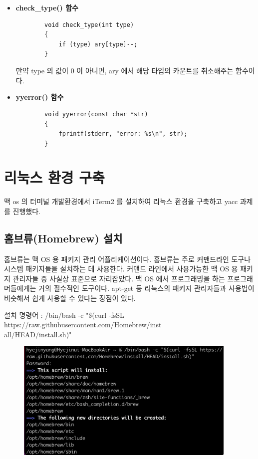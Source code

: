 \documentclass{article}
\begin{document}
\begin{itemize}
\begin{itemize}
		\item {\bf check\_type() 함수}
		\begin{lstlisting}
		void check_type(int type)
		{
			if (type) ary[type]--;
		}
		\end{lstlisting}
		만약 type 의 값이 0 이 아니면, ary 에서 해당 타입의 카운트를 취소해주는 함수이다.
		
		\item {\bf yyerror() 함수}
		\begin{lstlisting}
		void yyerror(const char *str)
		{
			fprintf(stderr, "error: %s\n", str);
		}
		\end{lstlisting}
	\end{itemize}
\end{itemize}

\section{리눅스 환경 구축}
맥 os 의 터미널 개발환경에서 iTerm2 를 설치하여 리눅스 환경을 구축하고 yacc 과제를 진행했다.
\subsection{홈브류(Homebrew) 설치}
홈브류는 맥 OS 용 패키지 관리 어플리케이션이다.
홈브류는 주로 커맨드라인 도구나 시스템 패키지들을 설치하는 데 사용한다.
커맨드 라인에서 사용가능한 맥 OS 용 패키지 관리자들 중 사실상 표준으로 자리잡았다.
맥 OS 에서 프로그래밍을 하는 프로그래머들에게는 거의 필수적인 도구이다.
apt-get 등 리눅스의 패키지 관리자들과 사용법이 비슷해서 쉽게 사용할 수 있다는 장점이 있다.

\vspace{3mm}
\noindent
설치 명령어 : 
/bin/bash -c "\$(curl -fsSL https://raw.githubusercontent.com/Homebrew/inst\\all/HEAD/install.sh)"
\begin{figure}[!htbp]
	\begin{center}
		\includegraphics[width=300pt]{hw3_homebrew.png}
	\end{center}
\end{figure}
\end{document}
